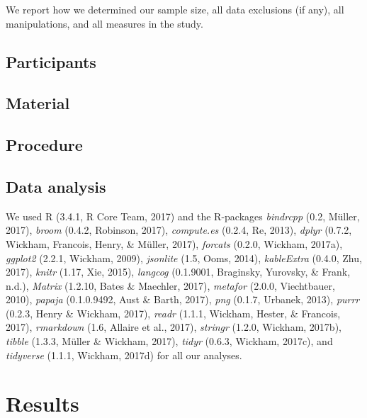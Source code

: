 \documentclass[english,floatsintext,man]{apa6}
\theoremstyle{definition}
\theoremstyle{definition}
\theoremstyle{remark}
\begin{document}
We report how we determined our sample size, all data exclusions (if
any), all manipulations, and all measures in the study.

\subsection{Participants}\label{participants}

\subsection{Material}\label{material}

\subsection{Procedure}\label{procedure}

\subsection{Data analysis}\label{data-analysis}

We used R (3.4.1, R Core Team, 2017) and the R-packages \emph{bindrcpp}
(0.2, Müller, 2017), \emph{broom} (0.4.2, Robinson, 2017),
\emph{compute.es} (0.2.4, Re, 2013), \emph{dplyr} (0.7.2, Wickham,
Francois, Henry, \& Müller, 2017), \emph{forcats} (0.2.0, Wickham,
2017a), \emph{ggplot2} (2.2.1, Wickham, 2009), \emph{jsonlite} (1.5,
Ooms, 2014), \emph{kableExtra} (0.4.0, Zhu, 2017), \emph{knitr} (1.17,
Xie, 2015), \emph{langcog} (0.1.9001, Braginsky, Yurovsky, \& Frank,
n.d.), \emph{Matrix} (1.2.10, Bates \& Maechler, 2017), \emph{metafor}
(2.0.0, Viechtbauer, 2010), \emph{papaja} (0.1.0.9492, Aust \& Barth,
2017), \emph{png} (0.1.7, Urbanek, 2013), \emph{purrr} (0.2.3, Henry \&
Wickham, 2017), \emph{readr} (1.1.1, Wickham, Hester, \& Francois,
2017), \emph{rmarkdown} (1.6, Allaire et al., 2017), \emph{stringr}
(1.2.0, Wickham, 2017b), \emph{tibble} (1.3.3, Müller \& Wickham, 2017),
\emph{tidyr} (0.6.3, Wickham, 2017c), and \emph{tidyverse} (1.1.1,
Wickham, 2017d) for all our analyses.

\section{Results}\label{results}
\end{document}
